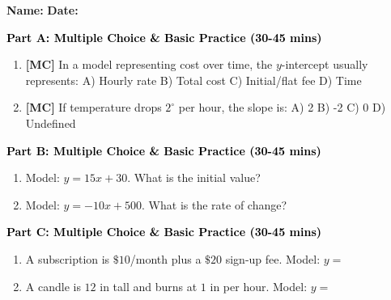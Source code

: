 \documentclass[12pt, letterpaper, fleqn]{article}
\newcommand{\blank}{\underline{\hspace{2.2cm}}}
\begin{document}
\textbf{Name:} \underline{\hspace{5cm}}
\hfill
\textbf{Date:} \underline{\hspace{3cm}}\\


\begin{tcolorbox}[colback=customteal!20]
\large\textcolor{black}{\textbf{Part A: Multiple Choice \& Basic Practice (30-45 mins)}}
\end{tcolorbox}

\vspace{3mm}

\begin{enumerate}[itemsep=2.5cm, leftmargin=0.6cm]
\item \textbf{[MC]} In a model representing cost over time, the $y$-intercept usually represents:
A) Hourly rate B) Total cost C) Initial/flat fee D) Time
\item \textbf{[MC]} If temperature drops $2^\circ$ per hour, the slope is:
A) 2 B) -2 C) 0 D) Undefined
\end{enumerate}

\newpage

\begin{tcolorbox}[colback=customteal!20]
\large\textcolor{black}{\textbf{Part B: Multiple Choice \& Basic Practice (30-45 mins)}}
\end{tcolorbox}

\vspace{3mm}

\begin{enumerate}[itemsep=2.5cm, leftmargin=0.6cm, resume]
\item Model: $y = 15x + 30$. What is the initial value? \blank
\item Model: $y = -10x + 500$. What is the rate of change? \blank
\end{enumerate}

\newpage

\begin{tcolorbox}[colback=customteal!20]
\large\textcolor{black}{\textbf{Part C: Multiple Choice \& Basic Practice (30-45 mins)}}
\end{tcolorbox}

\vspace{3mm}

\begin{enumerate}[itemsep=2.5cm, leftmargin=0.6cm, resume]
\item A subscription is $\$10$/month plus a $\$20$ sign-up fee. Model: $y = $ \blank
\item A candle is $12\text{ in}$ tall and burns at $1\text{ in}$ per hour. Model: $y = $ \blank
\end{enumerate}
\end{document}
